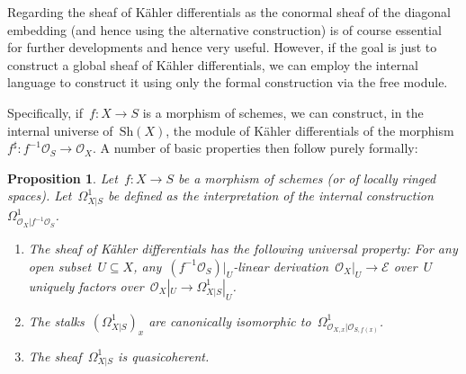 \documentclass[10pt,reqno,a4paper]{amsbook}
\theoremstyle{definition}
\theoremstyle{plain}
\newtheorem{prop}[defn]{Proposition}
\theoremstyle{remark}
\newcommand{\E}{\mathcal{E}}
\renewcommand{\O}{\mathcal{O}}
\newcommand{\Sh}{\mathrm{Sh}}
\newcommand{\?}{\,{:}\,}
\renewcommand{\_}{\mathpunct{.}\,}
\begin{document}
Regarding the sheaf of Kähler differentials as the conormal sheaf of the
diagonal embedding (and hence using the alternative construction) is of course
essential for further developments and hence very useful. However, if the goal
is just to construct a global sheaf of Kähler differentials, we can employ the
internal language to construct it using only the formal construction via the
free module.

Specifically, if~$f : X \to S$ is a morphism of schemes, we can construct, in
the internal universe of~$\Sh(X)$, the module of Kähler differentials of the
morphism~$f^\sharp : f^{-1}\O_S \to \O_X$. A number of basic properties then
follow purely formally:

\begin{prop}\label{prop:kaehler}Let~$f : X \to S$ be a morphism of schemes (or of locally ringed
spaces). Let~$\Omega^1_{X|S}$ be defined as the interpretation of the internal
construction~$\Omega^1_{\O_X|f^{-1}\O_S}$.
\begin{enumerate}
\item The sheaf of Kähler differentials has the following universal property:
For any open subset~$U \subseteq X$, any~$(f^{-1}\O_S)|_U$-linear
derivation~$\O_X|_U \to \E$ over~$U$ uniquely factors over~$\O_X|_U \to
\Omega^1_{X|S}|_U$.
\item The stalks~$(\Omega^1_{X|S})_x$ are canonically isomorphic
to~$\Omega^1_{\O_{X,x}|\O_{S,f(x)}}$.
\item The sheaf~$\Omega^1_{X|S}$ is quasicoherent.
\end{enumerate}
\end{prop}
\end{document}
